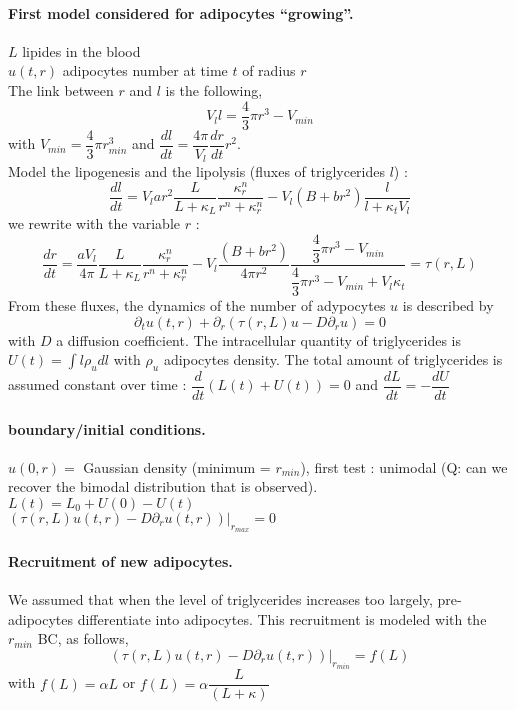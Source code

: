 \documentclass[11pt,a4paper]{article}
\begin{document}
\paragraph{First model considered for adipocytes ``growing''.\\}
$L$ lipides in the blood\\
$u(t,r)$ adipocytes number at time $t$ of radius $r$\\
The link between $r$ and $l$ is the following,
$$V_l l = \dfrac{4}{3} \pi r^3 - V_{min}$$
with $V_{min} = \dfrac{4}{3} \pi r_{min}^3$ and $\dfrac{dl}{dt} = \dfrac{4\pi}{V_l} \dfrac{dr}{dt} r^2$.\\

Model the lipogenesis and the lipolysis (fluxes of triglycerides $l$) : 
$$\dfrac{dl}{dt} = V_l a r^2 \dfrac{L}{L + \kappa_L} \dfrac{\kappa_r^n}{r^n+\kappa_r^n} - V_l (B + br^2) \dfrac{l}{l + \kappa_t V_l}$$
we rewrite with the variable $r$ : 
$$\dfrac{dr}{dt} = \dfrac{aV_l}{4\pi}  \dfrac{L}{L + \kappa_L} \dfrac{\kappa_r^n}{r^n+\kappa_r^n} - V_l \dfrac{(B + br^2)}{4\pi r^2} \dfrac{\dfrac{4}{3} \pi r^3 - V_{min}}{\dfrac{4}{3} \pi r^3 - V_{min} + V_l\kappa_t} = \tau(r, L)$$
From these fluxes, the dynamics of the number of adypocytes $u$ is described by 
$$\partial_t u(t, r) + \partial_r( \tau(r, L) u - D \partial_r u) = 0$$
with $D$ a diffusion coefficient.
The intracellular quantity of triglycerides is $U(t) = \displaystyle \int l \rho_u dl$ with $\rho_u$ adipocytes density. The total amount of triglycerides is assumed constant over time : $\dfrac{d}{dt}(L(t) + U(t)) = 0$ and $\dfrac{dL}{dt} = -\dfrac{dU}{dt}$
 
\paragraph{boundary/initial conditions.}
$u(0, r) =$ Gaussian density (minimum = $r_{min}$), first test : unimodal (Q: can we recover the bimodal distribution that is observed).\\
$L(t) = L_0 + U(0) - U(t)$\\
$(\tau(r, L) u(t,r) - D \partial_r u(t,r)) |_{r_{max}} = 0$
\paragraph{Recruitment of new adipocytes.} We assumed that when the level of triglycerides increases too largely, pre-adipocytes differentiate into adipocytes. This recruitment is modeled with the $r_{min}$ BC, as follows,
$$(\tau(r, L) u(t,r) - D \partial_r u(t,r)) |_{r_{min}}= f(L)$$ with $f(L) = \alpha L$ or $f(L) = \alpha \dfrac{L}{(L+\kappa)}$ 
\end{document}
